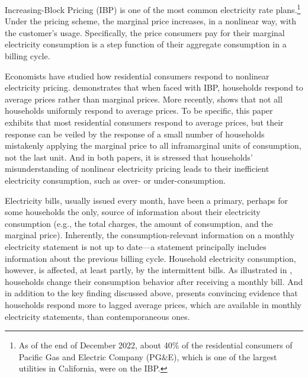 Increasing-Block Pricing (IBP) is one of the most common electricity rate plans.\footnote{As of the end of December 2022, about 40\% of the residential consumers of Pacific Gas and Electric Company (PG\&E), which is one of the largest utilities in California, were on the IBP.} Under the pricing scheme, the marginal price increases, in a nonlinear way, with the customer's usage. Specifically, the price consumers pay for their marginal electricity consumption is a step function of their aggregate consumption in a billing cycle. 

Economists have studied how residential consumers respond to nonlinear electricity pricing. \cite{Do-Consumers-Respond-to-Marginal-or-Average-Price?-Evidence-from-Nonlinear-Electricity-Pricing_2014_(Ito)} demonstrates that when faced with IBP, households respond to average prices rather than marginal prices. More recently, \cite{Misunderstanding-Nonlinear-Prices_2020_(Shaffer)} shows that not all households uniformly respond to average prices. To be specific, this paper exhibits that most residential consumers respond to average prices, but their response can be veiled by the response of a small number of households mistakenly applying the marginal price to all inframarginal units of consumption, not the last unit. And in both papers, it is stressed that households' misunderstanding of nonlinear electricity pricing leads to their inefficient electricity consumption, such as over- or under-consumption.

Electricity bills, usually issued every month, have been a primary, perhaps for some households the only, source of information about their electricity consumption (e.g., the total charges, the amount of consumption, and the marginal price). Inherently, the consumption-relevant information on a monthly electricity statement is not up to date---a statement principally includes information about the previous billing cycle. Household electricity consumption, however, is affected, at least partly, by the intermittent bills. As illustrated in \cite{Dynamic-Salience-with-Intermittent-Billing_Gilbert-and-Zivin_2014}, households change their consumption behavior after receiving a monthly bill. And in addition to the key finding discussed above, \cite{Do-Consumers-Respond-to-Marginal-or-Average-Price?-Evidence-from-Nonlinear-Electricity-Pricing_2014_(Ito)} presents convincing evidence that households respond more to lagged average prices, which are available in monthly electricity statements, than contemporaneous ones. 

